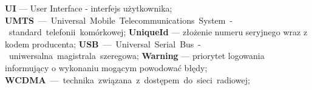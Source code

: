 \textbf{UI} --- User Interface - interfejs użytkownika;\newline
\textbf{UMTS} --- Universal Mobile Telecommunications System - standard telefonii komórkowej;\newline
\textbf{UniqueId} --- złożenie numeru seryjnego wraz z kodem producenta;\newline
\textbf{USB} --- Universal Serial Bus - uniwersalna magistrala szeregowa;\newline
\textbf{Warning} --- priorytet logowania informujący o wykonaniu mogącym powodować błędy;\newline
\textbf{WCDMA} --- technika związana z dostępem do sieci radiowej;\newline
